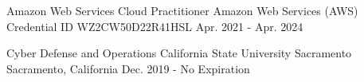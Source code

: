 

\begin{cventries}

  \cventry
    {Amazon Web Services Cloud Practitioner} %
    {Amazon Web Services (AWS)} %
    {Credential ID WZ2CW50D22R41HSL} %
	  {Apr. 2021 - Apr. 2024} %
    {
      \begin{cvitems} %
      \end{cvitems}
    }

  \cventry
    {Cyber Defense and Operations} %
    {California State University Sacramento} %
    {Sacramento, California} %
	  {Dec. 2019 - No Expiration} %
    {
      \begin{cvitems} %
      \end{cvitems}
    }

\end{cventries}
